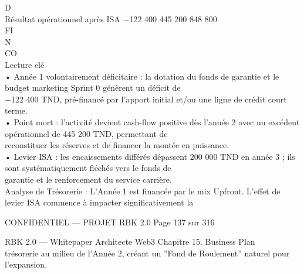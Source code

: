D\\
Résultat opérationnel après ISA           −122 400           445 200          848 800\\
\vspace{0.5em}
\vspace{0.5em}
\vspace{0.5em}
\vspace{0.5em}
FI\\
N\\
CO\\
Lecture clé\\
• Année 1 volontairement déficitaire : la dotation du fonds de garantie et le budget marketing Sprint 0 génèrent un déficit de\\
−122 400 TND, pré-financé par l’apport initial et/ou une ligne de crédit court terme.\\
\vspace{0.5em}
• Point mort : l’activité devient cash-flow positive dès l’année 2 avec un excédent opérationnel de 445 200 TND, permettant de\\
reconstituer les réserves et de financer la montée en puissance.\\
\vspace{0.5em}
• Levier ISA : les encaissements différés dépassent 200 000 TND en année 3 ; ils sont systématiquement fléchés vers le fonds de\\
garantie et le renforcement du service carrière.\\
\vspace{0.5em}
Analyse de Trésorerie : L’Année 1 est financée par le mix Upfront. L’effet de levier ISA commence à impacter significativement la\\
\vspace{0.5em}
\vspace{0.5em}
\begin{confidential}CONFIDENTIEL — PROJET RBK 2.0                                 Page 137 sur 316\end{confidential}
RBK 2.0 — Whitepaper Architecte Web3                                                                             Chapitre 15. Business Plan\\
\vspace{0.5em}
\vspace{0.5em}
trésorerie au milieu de l’Année 2, créant un ”Fond de Roulement” naturel pour l’expansion.\\
\vspace{0.5em}
\vspace{0.5em}
